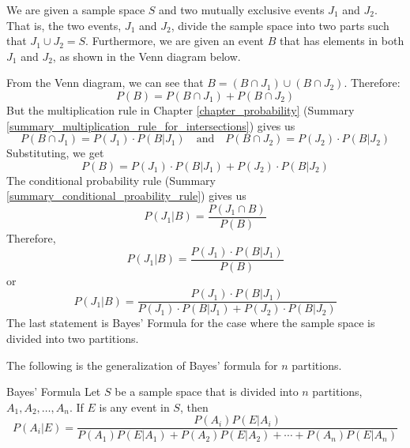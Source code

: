 We are given a sample space \( S \) and two mutually exclusive events \( J_1 \) and \( J_2 \). That is, the two events, \( J_1 \) and \( J_2 \), divide the sample space into two parts such that \( J_1 \cup J_2 = S \). Furthermore, we are given an event \( B \) that has elements in both \( J_1 \) and \( J_2 \), as shown in the Venn diagram below.


\begin{center}
\end{center}

From the Venn diagram, we can see that \( B = (B \cap J_1) \cup (B \cap J_2) \). Therefore:
\[
    P(B) = P(B \cap J_1) + P(B \cap J_2)
\]
But the multiplication rule in Chapter \ref{chapter_probability} (Summary \ref{summary_multiplication_rule_for_intersections}) gives us
\[
    P(B \cap J_1) = P(J_1) \cdot P(B | J_1) \quad \text{and} \quad P(B \cap J_2) = P(J_2) \cdot P(B | J_2)
\]
Substituting, we get
\[
    P(B) = P(J_1) \cdot P(B | J_1) + P(J_2) \cdot P(B | J_2)
\]
The conditional probability rule (Summary \ref{summary_conditional_proability_rule}) gives us
\[
    P(J_1 | B) = \frac{P(J_1 \cap B)}{P(B)}
\]
Therefore,
\[
    P(J_1 | B) = \frac{P(J_1) \cdot P(B | J_1)}{P(B)}
\]
or
\[
    P(J_1 | B) = \frac{P(J_1) \cdot P(B | J_1)}{P(J_1) \cdot P(B | J_1) + P(J_2) \cdot P(B | J_2)}
\]
The last statement is Bayes' Formula for the case where the sample space is divided into two partitions.

The following is the generalization of Bayes’ formula for $n$ partitions.
\begin{summarybox}{Bayes' Formula}\label{summary_bayes_formula}
    Let $S$ be a sample space that is divided into $n$ partitions, $A_1, A_2, \ldots, A_n$. If $E$ is any event in $S$, then
    \[
        P(A_i | E) = \frac{P(A_i)P(E | A_i)}{P(A_1)P(E | A_1) + P(A_2)P(E | A_2) + \cdots + P(A_n)P(E | A_n)}
    \]
\end{summarybox}

